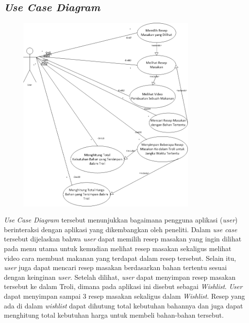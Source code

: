 	\subsection{\emph{Use Case Diagram}}
		\begin{figure}[H]
			\centering
			\includegraphics[origin=c,width=0.8\textwidth]{gambar/use-case/use_case_v2}
		\end{figure}
		\textit{Use Case Diagram} tersebut menunjukkan bagaimana pengguna aplikasi (\textit{user}) berinteraksi dengan aplikasi yang dikembangkan oleh peneliti. Dalam \textit{use case} tersebut dijelaskan bahwa \textit{user} dapat memilih resep masakan yang ingin dilihat pada menu utama untuk kemudian melihat resep masakan sekaligus melihat video cara membuat makanan yang terdapat dalam resep tersebut. Selain itu, \textit{user} juga dapat mencari resep masakan berdasarkan bahan tertentu sesuai dengan keinginan \textit{user}. Setelah dilihat, \textit{user} dapat menyimpan resep masakan tersebut ke dalam Troli, dimana pada aplikasi ini disebut sebagai \textit{Wishlist}. \textit{User} dapat menyimpan sampai 3 resep masakan sekaligus dalam \textit{Wishlist}. Resep yang ada di dalam \textit{wishlist} dapat dihutung total kebutuhan bahannya dan juga dapat menghitung total kebutuhan harga untuk membeli bahan-bahan tersebut.   
